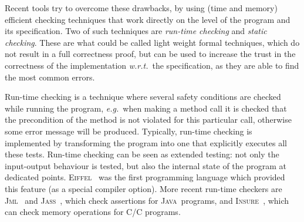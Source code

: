 \documentclass[a4paper]{llncs}
\newcommand{\jml}{\textsc{Jml}}
\newcommand{\eiffel}{\textsc{Eiffel}}
\newcommand{\jass}{\textsc{Jass}}
\newcommand{\java}{\textsc{Java}}
\newcommand{\cPP}{\textsc{C/C}\nolinebreak\hspace{-.05em}\raisebox{.4ex}{\tiny\bf
+}\nolinebreak\hspace{-.10em}\raisebox{.4ex}{\tiny\bf +}}
\newcommand{\insPP}{\textsc{Insure\nolinebreak\hspace{-.05em}\raisebox{.4ex}{\tiny\bf
+}\nolinebreak\hspace{-.10em}\raisebox{.4ex}{\tiny\bf +}}}
\begin{document}

Recent tools try to overcome these drawbacks, by using (time and
memory) efficient checking techniques that work directly on the level
of the program and its specification. Two of such techniques are
\textit{run-time checking} and \textit{static checking}. 
These are what could be called light weight formal techniques, which
do not result in a full correctness proof, but can be used to increase
the trust in the correctness of the implementation \emph{w.r.t.}~the
specification, as they are able to find the most common errors.

Run-time checking is a technique where several safety conditions are
checked while running the program, \emph{e.g.}~when making a method
call it is checked that the precondition of the method is not violated
for this particular call, otherwise some error message will be
produced. Typically, run-time checking is implemented by transforming
the program into one that explicitly executes all these
tests. Run-time checking can be seen as extended testing: not only the
input-output behaviour is tested, but also the internal state of the
program at dedicated points. \eiffel~\cite{Meyer97} was the first
programming language which provided this feature (as a special
compiler option). More recent run-time checkers are
\jml~\cite{LeavensBR00} and \jass~\cite{bartetzko01assertions}, 
which check assertions for \java\ programs, and
\insPP~\cite{InsurePP}, which can check memory operations for \cPP
programs. 



\end{document}
